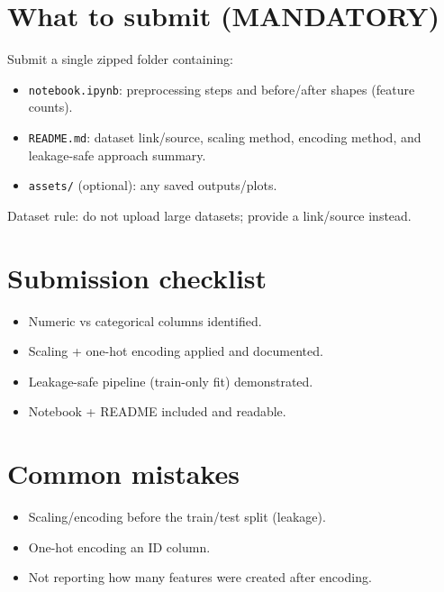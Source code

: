 \documentclass[11pt]{article}
\begin{document}
\section{What to submit (MANDATORY)}
Submit a single zipped folder containing:
\begin{itemize}[leftmargin=*]
  \item \texttt{notebook.ipynb}: preprocessing steps and before/after shapes (feature counts).
  \item \texttt{README.md}: dataset link/source, scaling method, encoding method, and leakage-safe approach summary.
  \item \texttt{assets/} (optional): any saved outputs/plots.
\end{itemize}
Dataset rule: do not upload large datasets; provide a link/source instead.

\section{Submission checklist}
\begin{itemize}[leftmargin=*]
  \item Numeric vs categorical columns identified.
  \item Scaling + one-hot encoding applied and documented.
  \item Leakage-safe pipeline (train-only fit) demonstrated.
  \item Notebook + README included and readable.
\end{itemize}

\section{Common mistakes}
\begin{itemize}[leftmargin=*]
  \item Scaling/encoding before the train/test split (leakage).
  \item One-hot encoding an ID column.
  \item Not reporting how many features were created after encoding.
\end{itemize}

\notesources{\AIMLLabSources}
\end{document}
